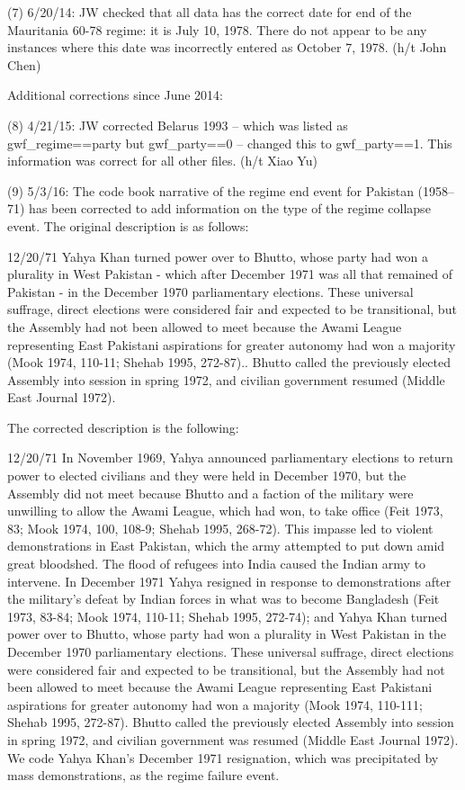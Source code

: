 (7) 6/20/14: JW checked that all data has the correct date for end of the Mauritania 60-78 regime: it is July 10, 1978.  There do not appear to be any instances where this date was incorrectly entered as October 7, 1978. (h/t John Chen) 

Additional corrections since June 2014:

(8) 4/21/15: JW corrected Belarus 1993 -- which was listed as gwf_regime==party but gwf_party==0 -- changed this to gwf_party==1. This information was correct for all other files.  (h/t Xiao Yu)

(9) 5/3/16: The code book narrative of the regime end event for Pakistan (1958--71) has been corrected to add information on the type of the regime collapse event.  The original description is as follows:

12/20/71  Yahya Khan turned power over to Bhutto, whose party had won a plurality in West Pakistan - which after December 1971 was all that remained of Pakistan - in the December 1970 parliamentary elections.  These universal suffrage, direct elections were considered fair and expected to be transitional, but the Assembly had not been allowed to meet because the Awami League representing East Pakistani aspirations for greater autonomy had won a majority (Mook 1974, 110-11; Shehab 1995, 272-87).. Bhutto called the previously elected Assembly into session in spring 1972, and civilian government resumed (Middle East Journal 1972).

The corrected description is the following: 

12/20/71  In November 1969, Yahya announced parliamentary elections to return power to elected civilians and they were held in December 1970, but the Assembly did not meet because Bhutto and a faction of the military were unwilling to allow the Awami League, which had won, to take office (Feit 1973, 83; Mook 1974, 100, 108-9; Shehab 1995, 268-72).  This impasse led to violent demonstrations in East Pakistan, which the army attempted to put down amid great bloodshed. The flood of refugees into India caused the Indian army to intervene.  In December 1971 Yahya resigned in response to demonstrations after the military’s defeat by Indian forces in what was to become Bangladesh (Feit 1973, 83-84; Mook 1974, 110-11; Shehab 1995, 272-74); and Yahya Khan turned power over to Bhutto, whose party had won a plurality in West Pakistan in the December 1970 parliamentary elections.  These universal suffrage, direct elections were considered fair and expected to be transitional, but the Assembly had not been allowed to meet because the Awami League representing East Pakistani aspirations for greater autonomy had won a majority (Mook 1974, 110-111; Shehab 1995, 272-87).  Bhutto called the previously elected Assembly into session in spring 1972, and civilian government was resumed (Middle East Journal 1972). We code Yahya Khan's December 1971 resignation, which was precipitated by mass demonstrations, as the regime failure event.


